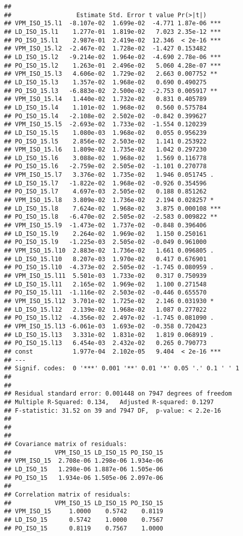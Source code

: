 \documentclass[
]{article}
\begin{document}
\begin{verbatim}
## 
##                  Estimate Std. Error t value Pr(>|t|)    
## VPM_ISO_15.l1  -8.107e-02  1.699e-02  -4.771 1.87e-06 ***
## LD_ISO_15.l1    1.277e-01  1.819e-02   7.023 2.35e-12 ***
## PO_ISO_15.l1    2.987e-01  2.419e-02  12.346  < 2e-16 ***
## VPM_ISO_15.l2  -2.467e-02  1.728e-02  -1.427 0.153482    
## LD_ISO_15.l2   -9.214e-02  1.964e-02  -4.690 2.78e-06 ***
## PO_ISO_15.l2    1.263e-01  2.496e-02   5.060 4.28e-07 ***
## VPM_ISO_15.l3   4.606e-02  1.729e-02   2.663 0.007752 ** 
## LD_ISO_15.l3    1.357e-02  1.968e-02   0.690 0.490275    
## PO_ISO_15.l3   -6.883e-02  2.500e-02  -2.753 0.005917 ** 
## VPM_ISO_15.l4   1.440e-02  1.732e-02   0.831 0.405789    
## LD_ISO_15.l4    1.101e-02  1.968e-02   0.560 0.575784    
## PO_ISO_15.l4   -2.108e-02  2.502e-02  -0.842 0.399627    
## VPM_ISO_15.l5  -2.693e-02  1.733e-02  -1.554 0.120239    
## LD_ISO_15.l5    1.080e-03  1.968e-02   0.055 0.956239    
## PO_ISO_15.l5    2.856e-02  2.503e-02   1.141 0.253922    
## VPM_ISO_15.l6   1.809e-02  1.735e-02   1.042 0.297230    
## LD_ISO_15.l6    3.088e-02  1.968e-02   1.569 0.116778    
## PO_ISO_15.l6   -2.759e-02  2.505e-02  -1.101 0.270778    
## VPM_ISO_15.l7   3.376e-02  1.735e-02   1.946 0.051745 .  
## LD_ISO_15.l7   -1.822e-02  1.968e-02  -0.926 0.354596    
## PO_ISO_15.l7    4.697e-03  2.505e-02   0.188 0.851262    
## VPM_ISO_15.l8   3.809e-02  1.736e-02   2.194 0.028257 *  
## LD_ISO_15.l8    7.624e-02  1.968e-02   3.875 0.000108 ***
## PO_ISO_15.l8   -6.470e-02  2.505e-02  -2.583 0.009822 ** 
## VPM_ISO_15.l9  -1.473e-02  1.737e-02  -0.848 0.396406    
## LD_ISO_15.l9    2.264e-02  1.969e-02   1.150 0.250161    
## PO_ISO_15.l9   -1.225e-03  2.505e-02  -0.049 0.961000    
## VPM_ISO_15.l10  2.883e-02  1.736e-02   1.661 0.096805 .  
## LD_ISO_15.l10   8.207e-03  1.970e-02   0.417 0.676901    
## PO_ISO_15.l10  -4.373e-02  2.505e-02  -1.745 0.080959 .  
## VPM_ISO_15.l11  5.501e-03  1.733e-02   0.317 0.750939    
## LD_ISO_15.l11   2.165e-02  1.969e-02   1.100 0.271548    
## PO_ISO_15.l11  -1.116e-02  2.503e-02  -0.446 0.655570    
## VPM_ISO_15.l12  3.701e-02  1.725e-02   2.146 0.031930 *  
## LD_ISO_15.l12   2.139e-02  1.968e-02   1.087 0.277022    
## PO_ISO_15.l12  -4.356e-02  2.497e-02  -1.745 0.081090 .  
## VPM_ISO_15.l13 -6.061e-03  1.693e-02  -0.358 0.720423    
## LD_ISO_15.l13   3.331e-02  1.831e-02   1.819 0.068919 .  
## PO_ISO_15.l13   6.454e-03  2.432e-02   0.265 0.790773    
## const           1.977e-04  2.102e-05   9.404  < 2e-16 ***
## ---
## Signif. codes:  0 '***' 0.001 '**' 0.01 '*' 0.05 '.' 0.1 ' ' 1
## 
## 
## Residual standard error: 0.001448 on 7947 degrees of freedom
## Multiple R-Squared: 0.134,   Adjusted R-squared: 0.1297 
## F-statistic: 31.52 on 39 and 7947 DF,  p-value: < 2.2e-16 
## 
## 
## 
## Covariance matrix of residuals:
##            VPM_ISO_15 LD_ISO_15 PO_ISO_15
## VPM_ISO_15  2.708e-06 1.298e-06 1.934e-06
## LD_ISO_15   1.298e-06 1.887e-06 1.505e-06
## PO_ISO_15   1.934e-06 1.505e-06 2.097e-06
## 
## Correlation matrix of residuals:
##            VPM_ISO_15 LD_ISO_15 PO_ISO_15
## VPM_ISO_15     1.0000    0.5742    0.8119
## LD_ISO_15      0.5742    1.0000    0.7567
## PO_ISO_15      0.8119    0.7567    1.0000
\end{verbatim}
\end{document}

